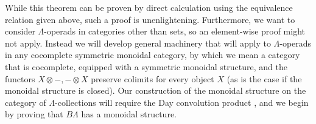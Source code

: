 While this theorem can be proven by direct calculation using the equivalence relation given above, such a proof is unenlightening. 
Furthermore, we want to consider $\Lambda$-operads in categories other than sets, so an element-wise proof might not apply. 
Instead we will develop general machinery that will apply to $\Lambda$-operads in any cocomplete symmetric monoidal category, by which we mean a category that is cocomplete, equipped with a symmetric monoidal structure, and the functors $X \otimes -, - \otimes X$ preserve colimits for every object $X$ (as is the case if the monoidal structure is closed). 
Our construction of the monoidal structure on the category of $\Lambda$-collections will require the Day convolution product \cite{day-thesis}, and we begin by proving that $B\Lambda$ has a monoidal structure.


